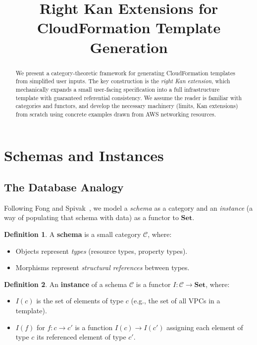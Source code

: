 \documentclass[11pt,a4paper]{article}
\title{Right Kan Extensions for CloudFormation Template Generation}
\author{}
\date{}
\theoremstyle{definition}
\newtheorem{definition}{Definition}[section]
\theoremstyle{plain}
\newcommand{\Set}{\mathbf{Set}}
\begin{document}
\maketitle

\begin{abstract}
We present a category-theoretic framework for generating CloudFormation templates from simplified user inputs. The key construction is the \emph{right Kan extension}, which mechanically expands a small user-facing specification into a full infrastructure template with guaranteed referential consistency. We assume the reader is familiar with categories and functors, and develop the necessary machinery (limits, Kan extensions) from scratch using concrete examples drawn from AWS networking resources.
\end{abstract}

\tableofcontents

\section{Schemas and Instances}

\subsection{The Database Analogy}

Following Fong and Spivak~\cite{fong2019invitation}, we model a \emph{schema} as a category and an \emph{instance} (a way of populating that schema with data) as a functor to $\Set$.

\begin{definition}
A \textbf{schema} is a small category $\mathcal{C}$, where:
\begin{itemize}
  \item Objects represent \emph{types} (resource types, property types).
  \item Morphisms represent \emph{structural references} between types.
\end{itemize}
\end{definition}

\begin{definition}
An \textbf{instance} of a schema $\mathcal{C}$ is a functor $I \colon \mathcal{C} \to \Set$, where:
\begin{itemize}
  \item $I(c)$ is the set of elements of type $c$ (e.g., the set of all VPCs in a template).
  \item $I(f)$ for $f \colon c \to c'$ is a function $I(c) \to I(c')$ assigning each element of type $c$ its referenced element of type $c'$.
\end{itemize}
\end{definition}
\end{document}

